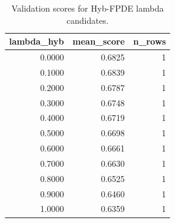\begin{table}[t]
\caption{Validation scores for Hyb-FPDE lambda candidates.}
\label{tab:lambda_distribution_computed}
\centering
\begin{tabular}{rrr}
\toprule
lambda\_hyb & mean\_score & n\_rows \\
\midrule
0.0000 & 0.6825 & 1 \\
0.1000 & 0.6839 & 1 \\
0.2000 & 0.6787 & 1 \\
0.3000 & 0.6748 & 1 \\
0.4000 & 0.6719 & 1 \\
0.5000 & 0.6698 & 1 \\
0.6000 & 0.6661 & 1 \\
0.7000 & 0.6630 & 1 \\
0.8000 & 0.6525 & 1 \\
0.9000 & 0.6460 & 1 \\
1.0000 & 0.6359 & 1 \\
\bottomrule
\end{tabular}

\end{table}
